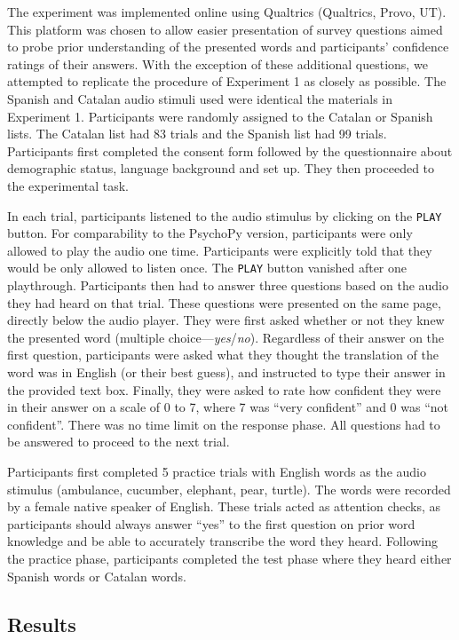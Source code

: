 \documentclass[
]{article}
\begin{document}
The experiment was implemented online using Qualtrics (Qualtrics, Provo,
UT). This platform was chosen to allow easier presentation of survey
questions aimed to probe prior understanding of the presented words and
participants' confidence ratings of their answers. With the exception of
these additional questions, we attempted to replicate the procedure of
Experiment 1 as closely as possible. The Spanish and Catalan audio
stimuli used were identical the materials in Experiment 1. Participants
were randomly assigned to the Catalan or Spanish lists. The Catalan list
had 83 trials and the Spanish list had 99 trials. Participants first
completed the consent form followed by the questionnaire about
demographic status, language background and set up. They then proceeded
to the experimental task.

In each trial, participants listened to the audio stimulus by clicking
on the \texttt{PLAY} button. For comparability to the PsychoPy version,
participants were only allowed to play the audio one time. Participants
were explicitly told that they would be only allowed to listen once. The
\texttt{PLAY} button vanished after one playthrough. Participants then
had to answer three questions based on the audio they had heard on that
trial. These questions were presented on the same page, directly below
the audio player. They were first asked whether or not they knew the
presented word (multiple choice---\emph{yes}/\emph{no}). Regardless of
their answer on the first question, participants were asked what they
thought the translation of the word was in English (or their best
guess), and instructed to type their answer in the provided text box.
Finally, they were asked to rate how confident they were in their answer
on a scale of 0 to 7, where 7 was ``very confident'' and 0 was ``not
confident''. There was no time limit on the response phase. All
questions had to be answered to proceed to the next trial.

Participants first completed 5 practice trials with English words as the
audio stimulus (ambulance, cucumber, elephant, pear, turtle). The words
were recorded by a female native speaker of English. These trials acted
as attention checks, as participants should always answer ``yes'' to the
first question on prior word knowledge and be able to accurately
transcribe the word they heard. Following the practice phase,
participants completed the test phase where they heard either Spanish
words or Catalan words.

\subsection{Results}\label{results-2}
\end{document}
